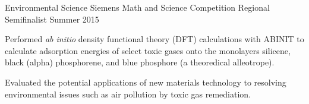 
\begin{cventries}

  \cventry
    {Environmental Science} %
    {Siemens Math and Science Competition} %
    {Regional Semifinalist} %
    {Summer 2015} %
    {
      \begin{cvitems}
        \item{Performed \textit{ab initio} density functional theory (DFT) calculations with ABINIT to calculate adsorption energies of select toxic gases onto the monolayers silicene, black (alpha) phosphorene, and blue phosphore (a theoredical alleotrope).}
        \item{Evaluated the potential applications of new materials technology to resolving environmental issues such as air pollution by toxic gas remediation.}
      \end{cvitems}
    }

\end{cventries}
